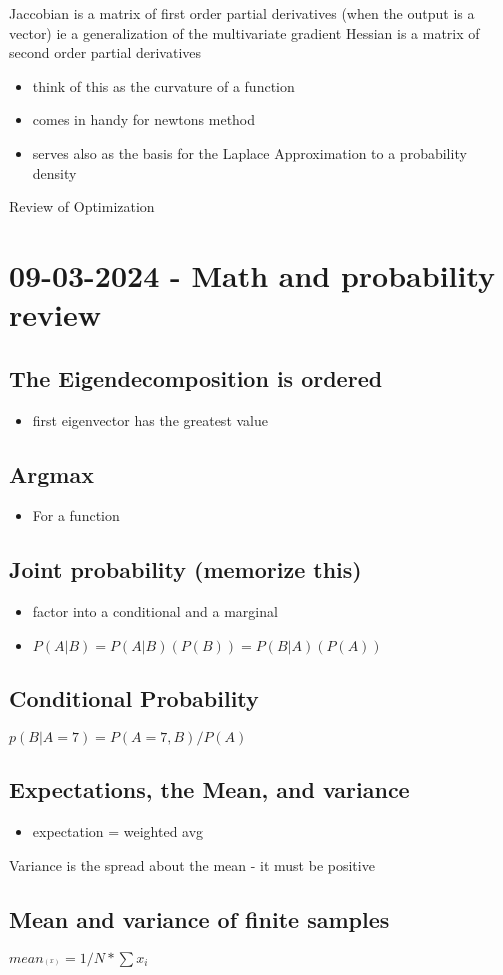 \documentclass[a4paper]{article}
\begin{document}
Jaccobian is a matrix of first order partial derivatives (when the output is a vector) ie a generalization of the multivariate gradient
Hessian is a matrix of second order partial derivatives
\begin{itemize}
\item think of this as the curvature of a function
\item comes in handy for newtons method
\item serves also as the basis for the Laplace Approximation to a probability density
\end{itemize}
Review of Optimization
\section{09-03-2024 - Math and probability review}
\label{sec:org33cd8ce}
\subsection{The Eigendecomposition is ordered}
\label{sec:orgbc039eb}
\begin{itemize}
\item first eigenvector has the greatest value
\end{itemize}
\subsection{Argmax}
\label{sec:org5b0f38c}
\begin{itemize}
\item For a function
\end{itemize}
\subsection{Joint probability (memorize this)}
\label{sec:org609c45e}
\begin{itemize}
\item factor into a conditional and a marginal
\item \(P(A|B) = P(A|B)(P(B)) = P(B|A)(P(A))\)
\end{itemize}
\subsection{Conditional Probability}
\label{sec:orgf44d677}
\(p(B|A = 7) = P(A = 7,B) / P(A)\)
\subsection{Expectations, the Mean, and variance}
\label{sec:orge04c962}
\begin{itemize}
\item expectation = weighted avg
\end{itemize}
Variance is the spread about the mean - it must be positive
\subsection{Mean and variance of finite samples}
\label{sec:org1b8eed5}
\(mean_^(x) = 1/N * \sum x_i\)
\end{document}
